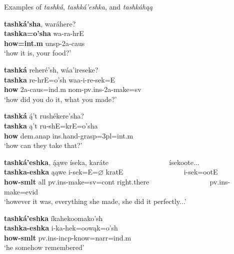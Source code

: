 \begin{exe}

\item\label{ExamplesOfTashka} Examples of \textit{tashká}, \textit{tashká'eshka}, and \textit{tashkáhąą}

\begin{xlist}

\item\label{ExamplesOfTashka1} \glll \textbf{tashká'sha}, waráhere?\\
    \textbf{tashka=o'sha} wa-ra-hrE\\
    \textbf{\textnormal{how}=int.m} unsp-2a-caus\\
    \glt `how it is, your food?' \citep[161]{hollow1973a}
    
\item\label{ExamplesOfTashka2} \glll \textbf{tashká} reheré'sh, wáa'ireseke?\\
    \textbf{tashka} re-hrE=o'sh waa-i-re-sek=E\\
    \textbf{\textnormal{how}} 2a-caus=ind.m nom-pv.ins-2a-\textnormal{make}=sv\\
    \glt `how did you do it, what you made?' \citep[3]{hollow1973a}
    
\item\label{ExamplesOfTashka3} \glll \textbf{tashká} ą́'t rushékere'sha?\\
    \textbf{tashka} ą't ru-shE=krE=o'sha\\
    \textbf{\textnormal{how}} dem.anap ins.hand-\textnormal{grasp}=3pl=int.m\\
    \glt `how can they take that?' \citep[267]{trechter2012}

\item\label{ExamplesOfTashka4} \glll \textbf{tashká'eshka}, ą́ąwe íseka, karáte ~ ~ ~ ~ ~ ~ ~ ~ ~ ~ ísekoote...\\
    \textbf{tashka-eshka} ąąwe i-sek=E=$\varnothing$ kratE ~ ~ ~ ~ ~ ~ ~ ~ ~ ~ i-sek=ootE\\
    \textbf{\textnormal{how}-smlt} \textnormal{all} pv.ins-\textnormal{make}=sv=cont \textnormal{right.there} ~ ~ ~ ~ ~ ~ ~ ~ ~ ~ pv.ins-\textnormal{make}=evid\\
    \glt `however it was, everything she made, she did it perfectly...' \citep[19]{trechter2012}

\item\label{ExamplesOfTashka5} \glll \textbf{tashká'eshka} íkahekoomako'sh\\
    \textbf{tashka-eshka} i-ka-hek=oowąk=o'sh\\
    \textbf{\textnormal{how}-smlt} pv.ins-incp-\textnormal{know}=narr=ind.m\\
    \glt `he somehow remembered' \citep[251]{trechter2012}
    

\end{xlist}
\end{exe}
